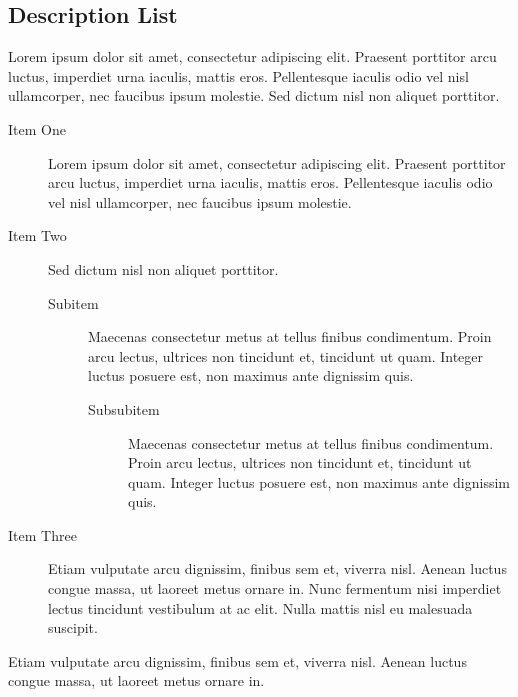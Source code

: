 \documentclass[
	a4paper, %
	12pt, %
]{include/CSSullivanBusinessReport}
\begin{document}

\subsection{Description List}

Lorem ipsum dolor sit amet, consectetur adipiscing elit. Praesent porttitor arcu luctus, imperdiet urna iaculis, mattis eros. Pellentesque iaculis odio vel nisl ullamcorper, nec faucibus ipsum molestie. Sed dictum nisl non aliquet porttitor.

\begin{description}
	\item[Item One] Lorem ipsum dolor sit amet, consectetur adipiscing elit. Praesent porttitor arcu luctus, imperdiet urna iaculis, mattis eros. Pellentesque iaculis odio vel nisl ullamcorper, nec faucibus ipsum molestie.
	\item[Item Two] Sed dictum nisl non aliquet porttitor.
	\begin{description}
		\item[Subitem] Maecenas consectetur metus at tellus finibus condimentum. Proin arcu lectus, ultrices non tincidunt et, tincidunt ut quam. Integer luctus posuere est, non maximus ante dignissim quis.
		\begin{description}
			\item[Subsubitem] Maecenas consectetur metus at tellus finibus condimentum. Proin arcu lectus, ultrices non tincidunt et, tincidunt ut quam. Integer luctus posuere est, non maximus ante dignissim quis.
	\end{description}
	\end{description}
	\item[Item Three] Etiam vulputate arcu dignissim, finibus sem et, viverra nisl. Aenean luctus congue massa, ut laoreet metus ornare in. Nunc fermentum nisi imperdiet lectus tincidunt vestibulum at ac elit. Nulla mattis nisl eu malesuada suscipit.
\end{description}

Etiam vulputate arcu dignissim, finibus sem et, viverra nisl. Aenean luctus congue massa, ut laoreet metus ornare in.
\end{document}
